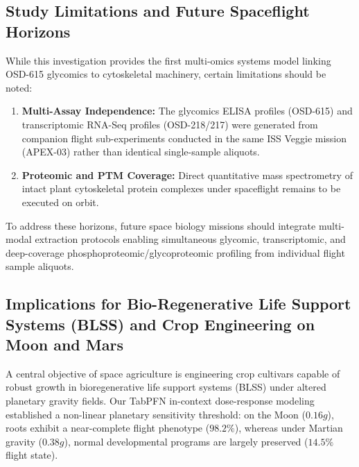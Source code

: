 \subsection{Study Limitations and Future Spaceflight Horizons}

While this investigation provides the first multi-omics systems model linking OSD-615 glycomics to cytoskeletal machinery, certain limitations should be noted:
\begin{enumerate}
    \item \textbf{Multi-Assay Independence:} The glycomics ELISA profiles (OSD-615) and transcriptomic RNA-Seq profiles (OSD-218/217) were generated from companion flight sub-experiments conducted in the same ISS Veggie mission (APEX-03) rather than identical single-sample aliquots.
    \item \textbf{Proteomic and PTM Coverage:} Direct quantitative mass spectrometry of intact plant cytoskeletal protein complexes under spaceflight remains to be executed on orbit.
\end{enumerate}

To address these horizons, future space biology missions should integrate multi-modal extraction protocols enabling simultaneous glycomic, transcriptomic, and deep-coverage phosphoproteomic/glycoproteomic profiling from individual flight sample aliquots.

\subsection{Implications for Bio-Regenerative Life Support Systems (BLSS) and Crop Engineering on Moon and Mars}

A central objective of space agriculture is engineering crop cultivars capable of robust growth in bioregenerative life support systems (BLSS) under altered planetary gravity fields. Our TabPFN in-context dose-response modeling established a non-linear planetary sensitivity threshold: on the Moon ($0.16g$), roots exhibit a near-complete flight phenotype ($98.2\%$), whereas under Martian gravity ($0.38g$), normal developmental programs are largely preserved ($14.5\%$ flight state).

